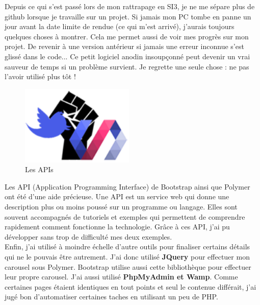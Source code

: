 \documentclass{article}
\begin{document}
Depuis ce qui s'est pass\'e lors de mon rattrapage en SI3, je ne me s\'epare plus de github lorsque je travaille sur un projet. Si jamais mon PC tombe en panne un jour avant la date limite de rendue (ce qui m'est arriv\'e), j'aurais toujours quelques choses \`a montrer. Cela me permet aussi de voir mes progr\`es sur mon projet. De revenir \`a une version ant\'erieur si jamais une erreur inconnue s'est gliss\'e dans le code... Ce petit logiciel anodin insoup\c{c}onn\'e peut devenir un vrai sauveur de temps si un probl\`eme survient. Je regrette une seule chose : ne pas l'avoir utilis\'e plus t\^ot !
\vspace{0.5cm}\\
\begin{figure}
  \vspace{-50pt}
  \begin{center}
    \includegraphics[width=0.48\textwidth]{p24}
  \end{center}
  \vspace{-20pt}
  \caption{Les APIs}
  \vspace{-10pt}
\end{figure}

Les API (Application Programming Interface) de Bootstrap ainsi que Polymer ont \'et\'e d'une aide pr\'ecieuse. Une API est un service web qui donne une description plus ou moins pouss\'e sur un programme ou langage. Elles sont souvent accompagn\'es de tutoriels et exemples qui permettent de comprendre rapidement comment fonctionne la technologie. Gr\^ace \`a ces API, j'ai pu d\'evelopper sans trop de difficult\'e mes deux exemples.
\vspace{0.5cm}\\
Enfin, j'ai utilis\'e \`a moindre \'echelle d'autre outils pour finaliser certains d\'etails qui ne le pouvais \^etre autrement. J'ai donc utilis\'e \textbf{JQuery} pour effectuer mon carousel sous Polymer. Bootstrap utilise aussi cette biblioth\`eque pour effectuer leur propre carousel. J'ai aussi utilis\'e \textbf{PhpMyAdmin et Wamp}. Comme certaines pages \'etaient identiques en tout points et seul le contenue diff\'erait, j'ai jug\'e bon d'automatiser certaines taches en utilisant un peu de PHP.
\newpage
\end{document}
